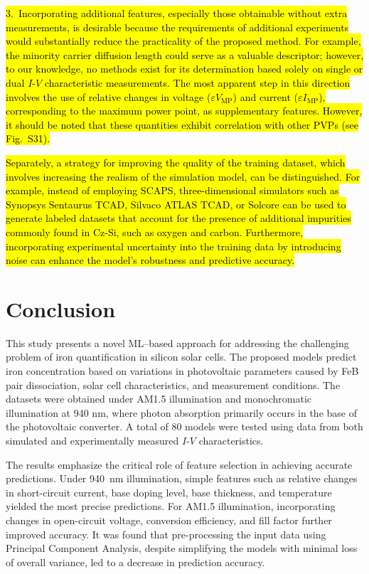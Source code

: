 \documentclass[a4paper,fleqn,draft]{cas-sc}
\begin{document}
\noindent
\textcolor[rgb]{1.00,0.07,0.00}{
\hl{
3.~Incorporating additional features, especially those obtainable without extra measurements,
is desirable because the requirements of additional experiments would substantially reduce
the practicality of the proposed method.
For example, the minority carrier diffusion length could serve as a valuable descriptor;
however, to our knowledge, no methods exist for its determination based solely
on single or dual $I$-$V$ characteristic measurements.
The most apparent step in this direction involves the use
of relative changes in voltage ($\varepsilon V_\mathrm{MP}$) and current ($\varepsilon I_\mathrm{MP}$),
corresponding to the maximum power point, as supplementary features.
However, it should be noted that these quantities exhibit correlation with other PVPs (see Fig.~S31).
}}

\textcolor[rgb]{1.00,0.07,0.00}{
\hl{
Separately, a strategy for improving the quality of the training dataset,
which involves increasing the realism of the simulation model, can be distinguished.
For example, instead of employing SCAPS, three-dimensional simulators such as Synopsys Sentaurus TCAD,
Silvaco ATLAS TCAD, or Solcore can be used to generate labeled datasets
that account for the presence of additional impurities commonly found in Cz-Si,
such as oxygen and carbon.
Furthermore, incorporating experimental uncertainty into the training data by introducing noise
can enhance the model’s robustness and predictive accuracy.
}}


\section{Conclusion}

This study presents a novel ML--based approach for addressing the challenging problem of
iron quantification in silicon solar cells.
The proposed models predict iron concentration based on variations in photovoltaic parameters caused by FeB pair dissociation,
solar cell characteristics, and measurement conditions.
The datasets were obtained under AM1.5 illumination and monochromatic illumination at 940 nm,
where photon absorption primarily occurs in the base of the photovoltaic converter.
A total of 80 models were tested using data from both simulated and experimentally measured $I$-$V$ characteristics.

The results emphasize the critical role of feature selection in achieving accurate predictions.
Under 940~nm illumination, simple features such as relative changes in short-circuit current,
base doping level, base thickness, and temperature yielded the most precise predictions.
For AM1.5 illumination, incorporating changes in open-circuit voltage, conversion efficiency, and fill factor further improved accuracy.
It was found that pre-processing the input data using Principal Component Analysis, despite simplifying the models with minimal loss of overall variance,
led to a decrease in prediction accuracy.
\end{document}
